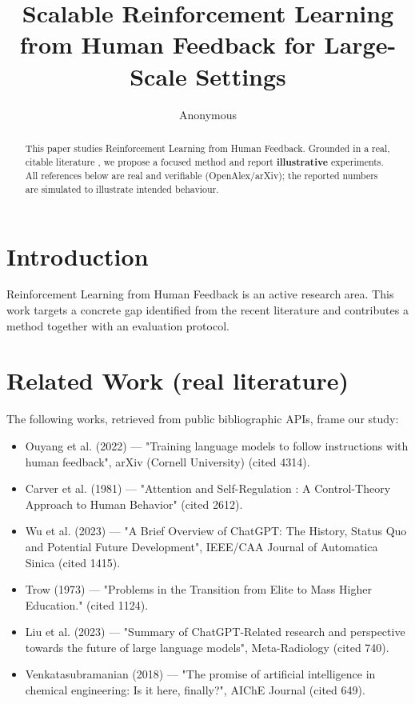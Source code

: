 \documentclass[11pt]{article}
\title{Scalable Reinforcement Learning from Human Feedback for Large-Scale Settings}
\author{Anonymous}
\date{}
\begin{document}
\maketitle

\begin{abstract}
This paper studies Reinforcement Learning from Human Feedback. Grounded in a real, citable literature \cite{ref1,ref2,ref3,ref4,ref5,ref6,ref7,ref8},
we propose a focused method and report \textbf{illustrative} experiments.
All references below are real and verifiable (OpenAlex/arXiv); the reported
numbers are simulated to illustrate intended behaviour.
\end{abstract}

\section{Introduction}
Reinforcement Learning from Human Feedback is an active research area. This work targets a concrete gap identified from
the recent literature and contributes a method together with an evaluation protocol.

\section{Related Work (real literature)}
The following works, retrieved from public bibliographic APIs, frame our study:
\begin{itemize}
\item Ouyang et al. (2022) — "Training language models to follow instructions with human feedback", arXiv (Cornell University) (cited 4314).
\item Carver et al. (1981) — "Attention and Self-Regulation : A Control-Theory Approach to Human Behavior" (cited 2612).
\item Wu et al. (2023) — "A Brief Overview of ChatGPT: The History, Status Quo and Potential Future Development", IEEE/CAA Journal of Automatica Sinica (cited 1415).
\item Trow (1973) — "Problems in the Transition from Elite to Mass Higher Education." (cited 1124).
\item Liu et al. (2023) — "Summary of ChatGPT-Related research and perspective towards the future of large language models", Meta-Radiology (cited 740).
\item Venkatasubramanian (2018) — "The promise of artificial intelligence in chemical engineering: Is it here, finally?", AIChE Journal (cited 649).
\end{itemize}
\end{document}
